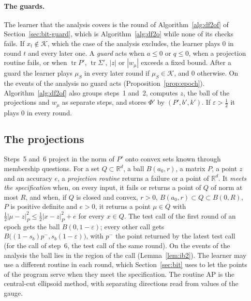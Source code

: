 \documentclass[11pt]{amsart}
\theoremstyle{definition}
\numberwithin{equation}{section}
\newcommand{\R}{\mathbb{R}}
\newcommand{\cK}{\mathcal{K}}
\newcommand{\tr}{\operatorname{tr}}
\begin{document}
\paragraph{The guards.} The learner that the analysis covers is the round of Algorithm~\ref{alg:df2of} of Section~\ref{sec:bit-guard}, which is Algorithm~\ref{alg:df2o} while none of its checks fails. If $x_t\notin\cK$, which the case of the analysis excludes, the learner plays $0$ in round $t$ and every later one. A \emph{guard} acts when $a\le0$ or $q\le0$, when a projection routine fails, or when $\tr P'$, $\tr\Sigma'$, $|z|$ or $|w_\mu|$ exceeds a fixed bound. After a guard the learner plays $\mu_S$ in every later round if $\mu_S\in\cK$, and $0$ otherwise. On the events of the analysis no guard acts (Proposition~\ref{prop:epoch}). Algorithm~\ref{alg:df2of} also groups steps~1 and~2, computes $z$, the ball of the projections and $w_\mu$ as separate steps, and stores $\Phi'$ by $(P',b',k')$. If $\varepsilon>\frac12$ it plays $0$ in every round.

\subsection{The projections}\label{sec:poly-proj}

Steps~5 and~6 project in the norm of $P'$ onto convex sets known through membership questions. For a set $Q\subset\R^d$, a ball $B(a_0,r)$, a matrix $P$, a point $z$ and an accuracy $e$, a \emph{projection routine} returns a failure or a point of $\R^d$. It \emph{meets the specification} when, on every input, it fails or returns a point of $Q$ of norm at most $R$, and when, if $Q$ is closed and convex, $r>0$, $B(a_0,r)\subset Q\subset B(0,R)$, $P$ is positive definite and $e>0$, it returns a point $\mu\in Q$ with $\frac12|\mu-z|^2_P\le\frac12|x-z|^2_P+e$ for every $x\in Q$. The test call of the first round of an epoch gets the ball $B(0,1-\varepsilon)$; every other call gets $B\bigl((1-s_b)p^-,s_b(1-\varepsilon)\bigr)$, with $p^-$ the point returned by the latest test call (for the call of step~6, the test call of the same round). On the events of the analysis the ball lies in the region of the call (Lemma~\ref{lem:ib2}). The learner may use a different routine in each round, which Section~\ref{sec:bit} uses to let the points of the program serve when they meet the specification. The routine AP is the central-cut ellipsoid method, with separating directions read from values of the gauge.
\end{document}
